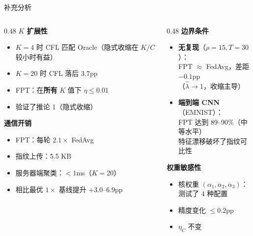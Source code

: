 \documentclass[aspectratio=169,11pt]{ctexbeamer}
\begin{document}
\begin{frame}{补充分析}

\begin{columns}[T]
\begin{column}{0.48\textwidth}
\textbf{$K$ 扩展性}
\begin{itemize}
  \item $K{=}4$ 时 CFL 匹配 Oracle（隐式收缩在 $K/C$ 较小时有益）
  \item $K{=}20$ 时 CFL 落后 3.7pp
  \item FPT：在\textbf{所有} $K$ 值下 $\eta \leq 0.01$
  \item 验证了推论 1（隐式收缩）
\end{itemize}

\vspace{8pt}
\textbf{通信开销}
\begin{itemize}
  \item FPT：每轮 $2.1\times$ FedAvg
  \item 指纹上传：5.5 KB
  \item 服务器端聚类：$<1$ms（$K{=}20$）
  \item 相比最优 $1\times$ 基线提升 +3.0--6.9pp
\end{itemize}
\end{column}

\begin{column}{0.48\textwidth}
\textbf{边界条件}
\begin{itemize}
  \item \textbf{无复现}（$\rho{=}15, T{=}30$）：\\
    FPT $\approx$ FedAvg，差距 $-0.1$pp\\
    （$\hat\lambda \to 1$，收缩主导）
  \item \textbf{端到端 CNN}（EMNIST）：\\
    FPT 达到 89--90\%（中等水平）\\
    特征漂移破坏了指纹可比性
\end{itemize}

\vspace{8pt}
\textbf{权重敏感性}
\begin{itemize}
  \item 核权重 $(\alpha_1, \alpha_2, \alpha_3)$：\\
    测试了 4 种配置
  \item 精度变化 $\leq 0.2$pp
  \item $\eta_C$ 不变
\end{itemize}
\end{column}
\end{columns}
\end{frame}
\end{document}
